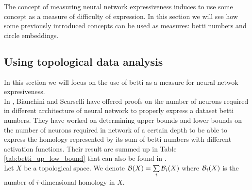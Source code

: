 \documentclass[12pt, a4paper]{article}
\begin{document}
The concept of measuring neural network expressiveness induces to use some concept as a measure of difficulty of expression. In this section we will see how some previously introduced concepts can be used as measures: betti numbers and circle embeddings. 

\subsection{Using topological data analysis}

In this section we will focus on the use of betti as a measure for neural netwok expresiveness.\\

In \cite{bianchini_complexity_2014}, Bianchini and Scarselli have offered proofs on the number of neurons required in different architecture of neural network to properly express a dataset betti numbers. They have worked on determining upper bounds and lower bounds on the number of neurons required in network of a certain depth to be able to express the homology represented by its sum of betti numbers with different activation functions. Their result are summed up in Table \ref{tab:betti_up_low_bound} that can also be found in \cite{bianchini_complexity_2014}.\\

Let $X$ be a topological space. We denote $\mathcal{B}(X) = \sum\limits_{i} \mathcal{B}_i(X)$ where $\mathcal{B}_i(X)$ is the number of $i$-dimensional homology in $X$.
\end{document}
